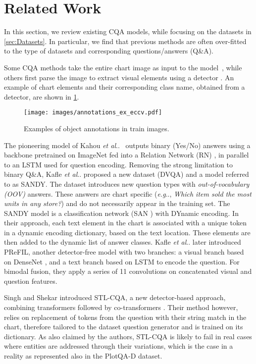 \documentclass[runningheads]{llncs}
\makeatletter
\DeclareRobustCommand\onedot{\futurelet\@let@token\@onedot}
\def\@onedot{\ifx\@let@token.\else.\null\fi\xspace}
\def\eg{\emph{e.g}\onedot} \def\Eg{\emph{E.g}\onedot}
\def\etal{\emph{et al}\onedot}
\makeatother
\begin{document}
\section{Related Work}
\label{sec:related}

In this section, we review existing CQA models, while focusing on the datasets in \cref{sec:Datasets}. In particular, we find that previous methods are often over-fitted to the type of datasets and corresponding questions/answers (Q\&A).

Some CQA methods take the entire chart image as input to the model~\cite{figureqa, dvqa, prefil}, while others
first parse the image to extract visual elements using a detector \cite{plotqa, chartqa, chaudhry2019leafqa}. An example of chart elements and their corresponding class name, obtained from a detector, are shown in  \cref{fig:visual_elements_names}.
\begin{figure}[t]
\begin{center}
   \texttt{[image: images/annotations\_ex\_eccv.pdf]}
\end{center}
   \caption{Examples of object annotations in train images.} \label{fig:visual_elements_names}
\end{figure}

The pioneering model of Kahou \etal~\cite{figureqa} outputs binary (Yes/No) answers using a backbone pretrained on ImageNet fed into a Relation Network (RN) \cite{SantoroRBMPBL17}, in parallel to an LSTM \cite{lstm} used for question encoding. Removing the strong limitation to binary Q\&A, Kafle \etal \cite{dvqa} proposed a new dataset (DVQA) and a model referred to as SANDY. The dataset introduces new question types with \emph{out-of-vocabulary (OOV)} answers. These answers are chart specific (\eg, {\it Which item sold the most units in any store?}) and do not necessarily appear in the training set. The SANDY model is a classification network (SAN \cite{yang2016stacked}) with DYnamic encoding. In their approach, each text element in the chart is associated with a unique token in a dynamic encoding dictionary, based on the text location. These elements are then added to the dynamic list of answer classes. Kafle \etal\cite{prefil} later introduced PReFIL, another detector-free model with two branches: a visual branch based on DenseNet \cite{densenet}, and a text branch based on LSTM to encode the question. For bimodal fusion, they apply a series of 11 convolutions on concatenated visual and question features.

Singh and Shekar \cite{chartqa} introduced STL-CQA, a new detector-based approach, combining transformers followed by co-transformers \cite{neuralMachineTranslation_ICLR15}.
Their method however, relies on replacement of tokens from the question with their string match in the chart, therefore tailored to the dataset question generator and is trained on its dictionary. As also claimed by the authors, STL-CQA is likely to fail in real cases where entities are addressed through their variations, which is the case in a reality as represented also in the PlotQA-D dataset.
\end{document}
